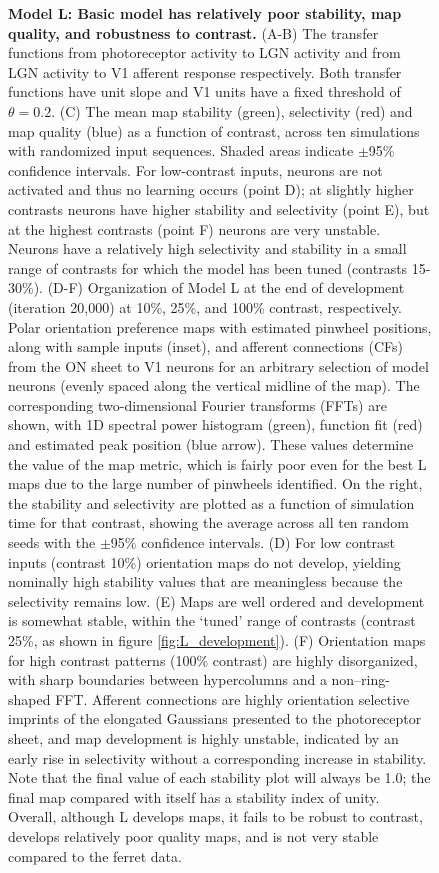 \documentclass{article}
\begin{document}
\begin{figure}
\caption[]{\textbf{Model L: Basic model has relatively poor
    stability, map quality, and robustness to contrast.}
  (A-B) The transfer
  functions from photoreceptor activity to LGN activity and from LGN
  activity to V1 afferent response respectively. Both transfer
  functions have unit slope and V1 units have a fixed threshold of
  $\theta=0.2$. (C) The mean map stability (green), selectivity (red)
  and map quality (blue) as a function of contrast, across ten
  simulations with randomized input sequences. Shaded areas indicate
  $\pm$95\% confidence intervals.  For low-contrast inputs, neurons
  are not activated and thus no learning occurs (point D); at slightly
  higher contrasts neurons have higher stability and selectivity
  (point E), but at the highest contrasts (point F) neurons are very
  unstable.  Neurons have a relatively high selectivity and stability
  in a small range of contrasts for which the model has been tuned
  (contrasts 15-30\%).
  (D-F) Organization of Model L at the end of development
  (iteration 20,000) at 10\%, 25\%, and 100\% contrast, respectively.
  Polar orientation preference maps with estimated pinwheel
  positions, along with sample inputs (inset), and afferent
  connections (CFs) from the ON sheet to V1 neurons for an arbitrary
  selection of model neurons (evenly spaced along the vertical midline
  of the map). The corresponding two-dimensional Fourier transforms
  (FFTs) are shown, with 1D spectral power histogram (green), function
  fit (red) and estimated peak position (blue arrow). These values
  determine the value of the map metric, which is fairly poor even for
  the best L maps due to the large number of pinwheels identified.  On
  the right, the stability and selectivity are plotted as a function
  of simulation time for that contrast, showing the average across all
  ten random seeds with the $\pm$95\% confidence intervals. (D) For
  low contrast inputs (contrast 10\%) orientation
  maps do not develop, yielding nominally
  high stability values that are meaningless because the selectivity
  remains low.  (E) Maps are well ordered and development is somewhat
  stable, within the `tuned' range of contrasts (contrast 25\%, as
  shown in figure \ref{fig:L_development}). (F) Orientation maps for
  high contrast patterns (100\% contrast) are highly disorganized,
  with sharp boundaries between hypercolumns and a non--ring-shaped
  FFT. Afferent connections are highly orientation selective imprints
  of the elongated Gaussians presented to the photoreceptor sheet, and
  map development is highly unstable, indicated by an early rise in
  selectivity without a corresponding increase in stability.
  Note that the final value of each stability plot will always be 1.0;
  the final map compared with itself has a stability index of
  unity. Overall, although L develops maps, it fails to be robust to
  contrast, develops relatively poor quality maps, and is not very
  stable compared to the ferret data.}
\label{fig:gaussian_L}

\end{figure}
\end{document}
